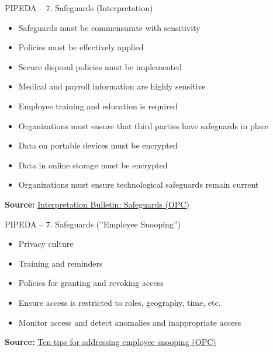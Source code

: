 \documentclass[ignorenonframetext,xcolor=x11names]{beamer}
\begin{document}
\begin{frame}{PIPEDA -- 7. Safeguards \small (Interpretation)}
\begin{itemize}
   \item Safeguards must be commensurate with sensitivity
   \item Policies must be effectively applied
   \item Secure disposal policies must be implemented
   \item Medical and payroll information are highly sensitive
   \item Employee training and education is required
   \item Organizations must ensure that third parties have safeguards in place
   \item Data on portable devices must be encrypted
   \item Data in online storage must be encrypted
   \item Organizations must ensure technological safeguards remain current
\end{itemize}

\vspace{\baselineskip}
\scriptsize \textbf{Source:} \href{https://www.priv.gc.ca/en/privacy-topics/privacy-laws-in-canada/the-personal-information-protection-and-electronic-documents-act-pipeda/pipeda-compliance-help/pipeda-interpretation-bulletins/interpretations_08_sg/}{Interpretation Bulletin: Safeguards (OPC)}
\end{frame}

\begin{frame}{PIPEDA -- 7. Safeguards \small (''Employee Snooping'')}
\begin{itemize}
   \item Privacy culture
   \item Training and reminders
   \item Policies for granting and revoking access
   \item Ensure access is restricted to roles, geography, time, etc.
   \item Monitor access and detect anomalies and inappropriate access
\end{itemize}

\vspace{\baselineskip}
\scriptsize \textbf{Source:} \href{https://www.priv.gc.ca/en/privacy-topics/business-privacy/safeguards-and-breaches/privacy-breaches/02_05_d_65_tips/}{Ten tips for addressing employee snooping (OPC)}
\end{frame}
\end{document}
